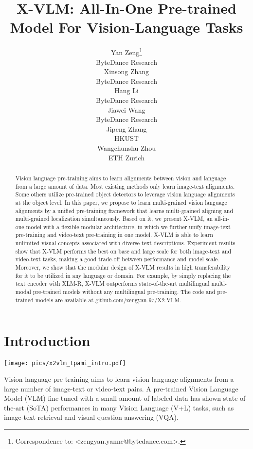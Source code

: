 \documentclass{article}
\title{X-VLM: All-In-One Pre-trained Model For Vision-Language Tasks}
\author{
Yan Zeng\thanks{Correspondence to: <zengyan.yanne@bytedance.com>.} \\
ByteDance Research \\
\And
Xinsong Zhang \\
ByteDance Research \\
\And
Hang Li \\
ByteDance Research \\
\AND 
Jiawei Wang \\
ByteDance Research \\
\And
Jipeng Zhang \\
HKUST \\
\And
Wangchunshu Zhou \\
ETH Zurich
}
\newcommand{\baby}{X-VLM\xspace}
\begin{document}
\maketitle

\begin{abstract}
Vision language pre-training aims to learn alignments between vision and language from a large amount of data. Most existing methods only learn image-text alignments. Some others utilize pre-trained object detectors to leverage vision language alignments at the object level. In this paper, we propose to learn multi-grained vision language alignments by a unified pre-training framework that learns multi-grained aligning and multi-grained localization simultaneously. Based on it, we present \baby, an all-in-one model with a flexible modular architecture, in which we further unify image-text pre-training and video-text pre-training in one model. \baby is able to learn unlimited visual concepts associated with diverse text descriptions. Experiment results show that \baby performs the best on base and large scale for both image-text and video-text tasks, making a good trade-off between performance and model scale. Moreover, we show that the modular design of \baby results in high transferability for it to be utilized in any language or domain. For example, by simply replacing the text encoder with XLM-R, \baby outperforms state-of-the-art multilingual multi-modal pre-trained models without any multilingual pre-training. The code and pre-trained models are available at \url{github.com/zengyan-97/X2-VLM}. 
\end{abstract}
 \section{Introduction}
\label{sec:introduction}


\begin{figure*}[ht]
\begin{center}
\centerline{\texttt{[image: pics/x2vlm\_tpami\_intro.pdf]}}
\caption{(a) Comparison of \baby with existing image-text pre-training methods on the visual reasoning task. (b) Comparison with existing video-text pre-training methods on video-text tasks. (c) Comparison with existing multilingual multi-modal pre-training methods.}
\vspace{-0.5cm}
\label{Fig:intro} 
\end{center}
\end{figure*}


Vision language pre-training aims to learn vision language alignments from a large number of image-text or video-text pairs. A pre-trained Vision Language Model (VLM) fine-tuned with a small amount of labeled data has shown state-of-the-art (SoTA) performances in many Vision Language (V+L) tasks, such as image-text retrieval and visual question answering (VQA).
\end{document}
